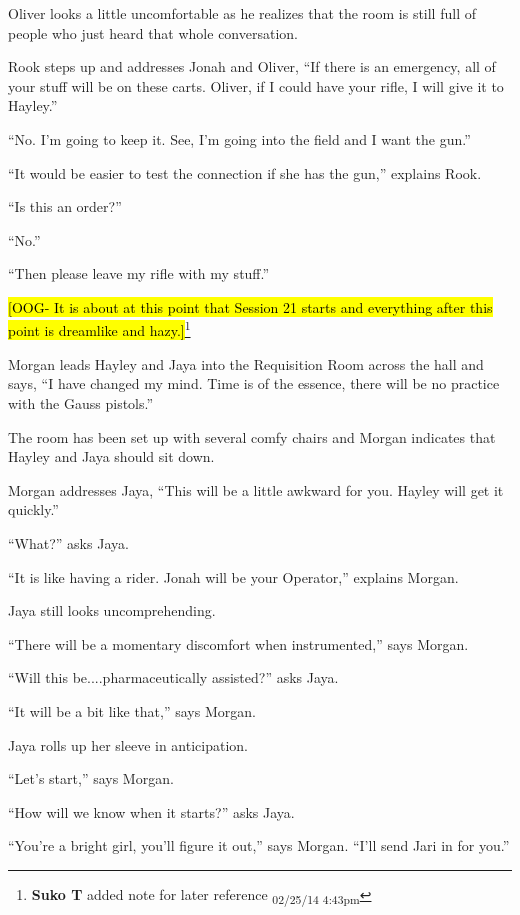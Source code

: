 Oliver looks a little uncomfortable as he realizes that the room is still full of people who just heard that whole conversation.



Rook steps up and addresses Jonah and Oliver, ``If there is an emergency, all of your stuff will be on these carts.  Oliver, if I could have your rifle, I will give it to Hayley.''

``No.  I'm going to keep it.  See, I'm going into the field and I want the gun.''

``It would be easier to test the connection if she has the gun,'' explains Rook.

``Is this an order?''

``No.''

``Then please leave my rifle with my stuff.''



\hl{{[}OOG- It is about at this point that Session 21 starts and everything after this point is dreamlike and hazy.{]}}\footnote{\textbf{Suko T }added note for later reference \textsubscript{02/25/14 4:43pm}}



Morgan leads Hayley and Jaya into the Requisition Room across the hall and says, ``I have changed my mind.  Time is of the essence, there will be no practice with the Gauss pistols.''

The room has been set up with several comfy chairs and Morgan indicates that Hayley and Jaya should sit down.

Morgan addresses Jaya, ``This will be a little awkward for you.  Hayley will get it quickly.''

``What?'' asks Jaya.

``It is like having a rider.  Jonah will be your Operator,'' explains Morgan.

Jaya still looks uncomprehending.

``There will be a momentary discomfort when instrumented,'' says Morgan.

``Will this be....pharmaceutically assisted?'' asks Jaya.

``It will be a bit like that,'' says Morgan.

Jaya rolls up her sleeve in anticipation.

``Let's start,'' says Morgan.

``How will we know when it starts?'' asks Jaya.

``You're a bright girl, you'll figure it out,'' says Morgan.  ``I'll send Jari in for you.''

